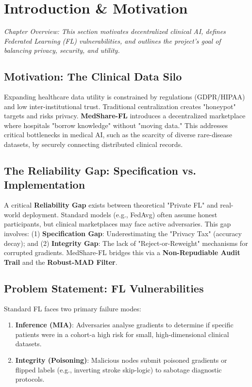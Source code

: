 \documentclass[10pt, a4paper, twocolumn]{article}
\begin{document}
\section{Introduction \& Motivation}

\textit{Chapter Overview: This section motivates decentralized clinical AI, defines Federated Learning (FL) vulnerabilities, and outlines the project's goal of balancing privacy, security, and utility.}

\subsection{Motivation: The Clinical Data Silo}
Expanding healthcare data utility is constrained by regulations (GDPR/HIPAA) and low inter-institutional trust. Traditional centralization creates "honeypot" targets and risks privacy. \textbf{MedShare-FL} introduces a decentralized marketplace where hospitals "borrow knowledge" without "moving data." This addresses critical bottlenecks in medical AI, such as the scarcity of diverse rare-disease datasets, by securely connecting distributed clinical records.

\subsection{The Reliability Gap: Specification vs. Implementation}
A critical \textbf{Reliability Gap} exists between theoretical "Private FL" and real-world deployment. Standard models (e.g., FedAvg) often assume honest participants, but clinical marketplaces may face active adversaries. This gap involves: (1) \textbf{Specification Gap}: Underestimating the "Privacy Tax" (accuracy decay); and (2) \textbf{Integrity Gap}: The lack of "Reject-or-Reweight" mechanisms for corrupted gradients. MedShare-FL bridges this via a \textbf{Non-Repudiable Audit Trail} and the \textbf{Robust-MAD Filter}.

\subsection{Problem Statement: FL Vulnerabilities}
Standard FL faces two primary failure modes:
\begin{enumerate}[leftmargin=*, nosep]
    \item \textbf{Inference (MIA)}: Adversaries analyse gradients to determine if specific patients were in a cohort-a high risk for small, high-dimensional clinical datasets.
    \item \textbf{Integrity (Poisoning)}: Malicious nodes submit poisoned gradients or flipped labels (e.g., inverting stroke skip-logic) to sabotage diagnostic protocols.
\end{enumerate}
\end{document}
